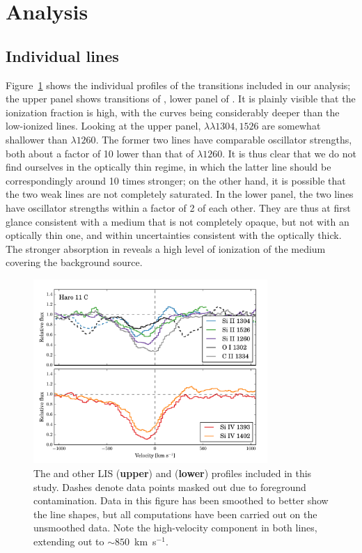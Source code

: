 \documentclass[twocolumn,]{aastex61}
\begin{document}
\section{Analysis}\label{analysis}

\subsection{Individual lines}\label{individual-lines}

Figure~\ref{fig:SingleLines} shows the individual profiles of the
transitions included in our analysis; the upper panel shows transitions
of , lower panel of . It is plainly visible that
the ionization fraction is high, with the  curves being
considerably deeper than the low-ionized lines. Looking at the upper
panel,  $\lambda \lambda 1304, 1526$ are somewhat shallower
than  $\lambda 1260$. The former two lines have comparable
oscillator strengths, both about a factor of 10 lower than that of
$\lambda 1260$. It is thus clear that we do not find ourselves in the
optically thin regime, in which the latter line should be
correspondingly around 10 times stronger; on the other hand, it is
possible that the two weak lines are not completely saturated. In the
lower panel, the two  lines have oscillator strengths within
a factor of 2 of each other. They are thus at first glance consistent
with a medium that is not completely opaque, but not with an optically
thin one, and within uncertainties consistent with the optically thick.
The stronger absorption in  reveals a high level of
ionization of the medium covering the background source.

\begin{figure}
\centering
\includegraphics[width=3.500in]{./HISLISProfiles.pdf}
\caption{The  and other LIS (\textbf{upper}) and 
(\textbf{lower}) profiles included in this study. Dashes denote data
points masked out due to foreground contamination. Data in this figure has
been smoothed to better show the line shapes, but all computations have been
carried out on the unsmoothed data. Note the
high-velocity component in both  lines, extending out to
$\sim 850$~km~s$^{-1}$.}\label{fig:SingleLines}
\end{figure}
\end{document}

